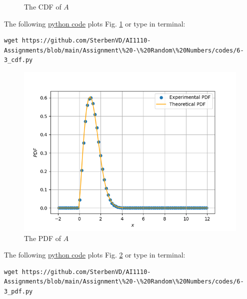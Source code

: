 \documentclass[journal,12pt,twocolumn]{IEEEtran}
\numberwithin{equation}{section}
\renewcommand\thesection{\arabic{section}}
\providecommand{\gitlink}[2]{{\color{blue}\href{https://github.com/SterbenVD/AI1110-Assignments/blob/main/Assignment\%20-\%20Random\%20Numbers/#1}{#2}}}
\begin{document}
\begin{enumerate}[label=\thesection.\arabic*
        ,ref=\thesection.\theenumi]
\begin{figure}[H]
              \caption{The CDF of $A$}
              \label{fig:6-3_cdf}
          \end{figure}
          The following \gitlink{codes/6-3_cdf.py}{python code} plots Fig. \ref{fig:6-3_cdf} or type in terminal:
          \begin{lstlisting}
wget https://github.com/SterbenVD/AI1110-Assignments/blob/main/Assignment\%20-\%20Random\%20Numbers/codes/6-3_cdf.py
            \end{lstlisting}
          \begin{figure}[H]
              \centering
              \includegraphics[width = \columnwidth]{../figs/6-3_pdf.png}
              \caption{The PDF of $A$}
              \label{fig:6-3_pdf}
          \end{figure}
          The following \gitlink{codes/6-3_pdf.py}{python code} plots Fig. \ref{fig:6-3_pdf} or type in terminal:
          \begin{lstlisting}
wget https://github.com/SterbenVD/AI1110-Assignments/blob/main/Assignment\%20-\%20Random\%20Numbers/codes/6-3_pdf.py
              \end{lstlisting}
\end{enumerate}
\end{document}
